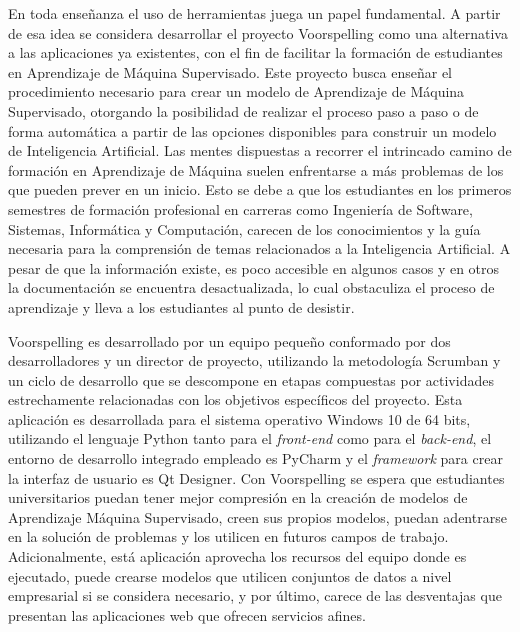En toda enseñanza el uso de herramientas juega un papel fundamental. A partir de esa idea se considera desarrollar el proyecto Voorspelling como una alternativa a las aplicaciones ya existentes, con el fin de facilitar la formación de estudiantes en Aprendizaje de Máquina Supervisado. Este proyecto busca enseñar el procedimiento necesario para crear un modelo de Aprendizaje de Máquina Supervisado, otorgando la posibilidad de realizar el proceso paso a paso o de forma automática a partir de las opciones disponibles para construir un modelo de Inteligencia Artificial. Las mentes dispuestas a recorrer el intrincado camino de formación en Aprendizaje de Máquina suelen enfrentarse a más problemas de los que pueden prever en un inicio. Esto se debe a que los estudiantes en los primeros semestres de formación profesional en carreras como Ingeniería de Software, Sistemas, Informática y Computación, carecen de los conocimientos y la guía necesaria para la comprensión de temas relacionados a la Inteligencia Artificial. A pesar de que la información existe, es poco accesible en algunos casos y en otros la documentación se encuentra desactualizada, lo cual obstaculiza el proceso de aprendizaje y lleva a los estudiantes al punto de desistir.

Voorspelling es desarrollado por un equipo pequeño conformado por dos desarrolladores y un director de proyecto, utilizando la metodología Scrumban y un ciclo de desarrollo que se descompone en etapas compuestas por actividades estrechamente relacionadas con los objetivos específicos del proyecto. Esta aplicación es desarrollada para el sistema operativo Windows 10 de 64 bits, utilizando el lenguaje Python tanto para el \textit{front-end} como para el \textit{back-end}, el entorno de desarrollo integrado empleado es PyCharm y el \textit{framework} para crear la interfaz de usuario es Qt Designer. Con Voorspelling se espera que estudiantes universitarios puedan tener mejor compresión en la creación de modelos de Aprendizaje Máquina Supervisado, creen sus propios modelos, puedan adentrarse en la solución de problemas y los utilicen en futuros campos de trabajo. Adicionalmente, está aplicación aprovecha los recursos del equipo donde es ejecutado, puede crearse modelos que utilicen conjuntos de datos a nivel empresarial si se considera necesario, y por último, carece de las desventajas que presentan las aplicaciones web que ofrecen servicios afines.
